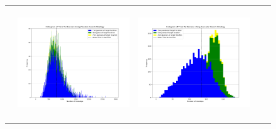 \begin{landscape}
\begin{table}[h!]
\begin{tabular}{ | c | c | c | c | c |}
\begin{minipage}[c][49mm][c]{49mm}
    \end{minipage}
    &
    \begin{minipage}[c][49mm][c]{49mm}
      \includegraphics[width=49mm, height=49mm]{Chapters/MultiAgentTargetDetection/Figs/Histograms/MultipleTarget/2/2RandomHistogram.png}
    \end{minipage}
    &
    \begin{minipage}[c][49mm][c]{49mm}
      \includegraphics[width=49mm, height=49mm]{Chapters/MultiAgentTargetDetection/Figs/Histograms/MultipleTarget/2/2SaccadicHistogram.png}
    \end{minipage}
    \\


\end{tabular}
\end{table}
\end{landscape}
